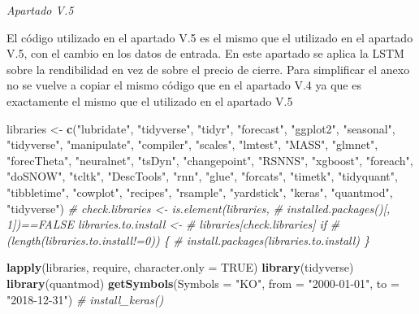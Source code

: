 \documentclass[]{DissertateUSU}
\newenvironment{Shaded}{\begin{snugshade}}{\end{snugshade}}
\newcommand{\CommentTok}[1]{\textcolor[rgb]{0.56,0.35,0.01}{\textit{#1}}}
\newcommand{\DataTypeTok}[1]{\textcolor[rgb]{0.13,0.29,0.53}{#1}}
\newcommand{\KeywordTok}[1]{\textcolor[rgb]{0.13,0.29,0.53}{\textbf{#1}}}
\newcommand{\NormalTok}[1]{#1}
\newcommand{\OtherTok}[1]{\textcolor[rgb]{0.56,0.35,0.01}{#1}}
\newcommand{\StringTok}[1]{\textcolor[rgb]{0.31,0.60,0.02}{#1}}
\begin{document}
\normalsize

\emph{Apartado V.5} \setlength\parskip{5ex}

El código utilizado en el apartado V.5 es el mismo que el utilizado en
el apartado V.5, con el cambio en los datos de entrada. En este apartado
se aplica la LSTM sobre la rendibilidad en vez de sobre el precio de
cierre. Para simplificar el anexo no se vuelve a copiar el mismo código
que en el apartado V.4 ya que es exactamente el mismo que el utilizado
en el apartado V.5 \setlength\parskip{5ex}

\scriptsize

\begin{Shaded}
\begin{Highlighting}[]
\NormalTok{libraries <-}\StringTok{ }\KeywordTok{c}\NormalTok{(}\StringTok{"lubridate"}\NormalTok{, }\StringTok{"tidyverse"}\NormalTok{, }\StringTok{"tidyr"}\NormalTok{, }\StringTok{"forecast"}\NormalTok{, }
    \StringTok{"ggplot2"}\NormalTok{, }\StringTok{"seasonal"}\NormalTok{, }\StringTok{"tidyverse"}\NormalTok{, }\StringTok{"manipulate"}\NormalTok{, }\StringTok{"compiler"}\NormalTok{, }
    \StringTok{"scales"}\NormalTok{, }\StringTok{"lmtest"}\NormalTok{, }\StringTok{"MASS"}\NormalTok{, }\StringTok{"glmnet"}\NormalTok{, }\StringTok{"forecTheta"}\NormalTok{, }\StringTok{"neuralnet"}\NormalTok{, }
    \StringTok{"tsDyn"}\NormalTok{, }\StringTok{"changepoint"}\NormalTok{, }\StringTok{"RSNNS"}\NormalTok{, }\StringTok{"xgboost"}\NormalTok{, }\StringTok{"foreach"}\NormalTok{, }\StringTok{"doSNOW"}\NormalTok{, }
    \StringTok{"tcltk"}\NormalTok{, }\StringTok{"DescTools"}\NormalTok{, }\StringTok{"rnn"}\NormalTok{, }\StringTok{"glue"}\NormalTok{, }\StringTok{"forcats"}\NormalTok{, }\StringTok{"timetk"}\NormalTok{, }
    \StringTok{"tidyquant"}\NormalTok{, }\StringTok{"tibbletime"}\NormalTok{, }\StringTok{"cowplot"}\NormalTok{, }\StringTok{"recipes"}\NormalTok{, }\StringTok{"rsample"}\NormalTok{, }
    \StringTok{"yardstick"}\NormalTok{, }\StringTok{"keras"}\NormalTok{, }\StringTok{"quantmod"}\NormalTok{, }\StringTok{"tidyverse"}\NormalTok{)}
\CommentTok{# check.libraries <- is.element(libraries,}
\CommentTok{# installed.packages()[, 1])==FALSE libraries.to.install <-}
\CommentTok{# libraries[check.libraries] if}
\CommentTok{# (length(libraries.to.install!=0)) \{}
\CommentTok{# install.packages(libraries.to.install) \}}

\KeywordTok{lapply}\NormalTok{(libraries, require, }\DataTypeTok{character.only =} \OtherTok{TRUE}\NormalTok{)}
\KeywordTok{library}\NormalTok{(tidyverse)}
\KeywordTok{library}\NormalTok{(quantmod)}
\KeywordTok{getSymbols}\NormalTok{(}\DataTypeTok{Symbols =} \StringTok{"KO"}\NormalTok{, }\DataTypeTok{from =} \StringTok{"2000-01-01"}\NormalTok{, }\DataTypeTok{to =} \StringTok{"2018-12-31"}\NormalTok{)}
\CommentTok{# install_keras()}


\end{Highlighting}
\end{Shaded}
\end{document}
